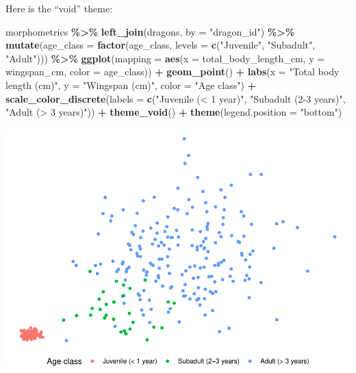 \documentclass[
]{book}
\newenvironment{Shaded}{\begin{snugshade}}{\end{snugshade}}
\newcommand{\AttributeTok}[1]{\textcolor[rgb]{0.13,0.29,0.53}{#1}}
\newcommand{\FunctionTok}[1]{\textcolor[rgb]{0.13,0.29,0.53}{\textbf{#1}}}
\newcommand{\NormalTok}[1]{#1}
\newcommand{\SpecialCharTok}[1]{\textcolor[rgb]{0.81,0.36,0.00}{\textbf{#1}}}
\newcommand{\StringTok}[1]{\textcolor[rgb]{0.31,0.60,0.02}{#1}}
\begin{document}
Here is the ``void'' theme:

\begin{Shaded}
\begin{Highlighting}[]
\NormalTok{morphometrics }\SpecialCharTok{\%\textgreater{}\%} 
  \FunctionTok{left\_join}\NormalTok{(dragons, }\AttributeTok{by =} \StringTok{"dragon\_id"}\NormalTok{) }\SpecialCharTok{\%\textgreater{}\%} 
  \FunctionTok{mutate}\NormalTok{(}\AttributeTok{age\_class =} \FunctionTok{factor}\NormalTok{(age\_class, }\AttributeTok{levels =} \FunctionTok{c}\NormalTok{(}\StringTok{"Juvenile"}\NormalTok{,}
                                                  \StringTok{"Subadult"}\NormalTok{,}
                                                  \StringTok{"Adult"}\NormalTok{))) }\SpecialCharTok{\%\textgreater{}\%} 
\FunctionTok{ggplot}\NormalTok{(}\AttributeTok{mapping =} \FunctionTok{aes}\NormalTok{(}\AttributeTok{x =}\NormalTok{ total\_body\_length\_cm, }\AttributeTok{y =}\NormalTok{ wingspan\_cm, }\AttributeTok{color =}\NormalTok{ age\_class)) }\SpecialCharTok{+}
  \FunctionTok{geom\_point}\NormalTok{() }\SpecialCharTok{+}
  \FunctionTok{labs}\NormalTok{(}\AttributeTok{x =} \StringTok{"Total body length (cm)"}\NormalTok{, }\AttributeTok{y =} \StringTok{"Wingspan (cm)"}\NormalTok{, }\AttributeTok{color =} \StringTok{"Age class"}\NormalTok{) }\SpecialCharTok{+}
  \FunctionTok{scale\_color\_discrete}\NormalTok{(}\AttributeTok{labels =} \FunctionTok{c}\NormalTok{(}\StringTok{"Juvenile (\textless{} 1 year)"}\NormalTok{,}
                                 \StringTok{"Subadult (2{-}3 years)"}\NormalTok{,}
                                 \StringTok{"Adult (\textgreater{} 3 years)"}\NormalTok{)) }\SpecialCharTok{+}
  \FunctionTok{theme\_void}\NormalTok{() }\SpecialCharTok{+}
  \FunctionTok{theme}\NormalTok{(}\AttributeTok{legend.position =} \StringTok{"bottom"}\NormalTok{) }
\end{Highlighting}
\end{Shaded}

\includegraphics{reproducible-science_files/figure-latex/gg15-1.pdf}
\end{document}
